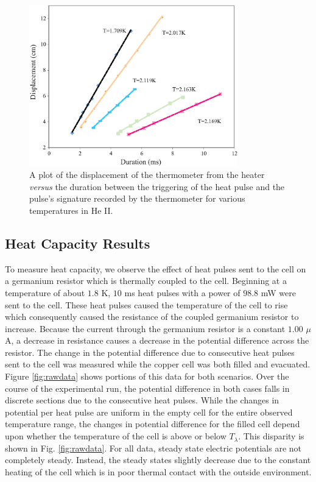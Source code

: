 \begin{figure}[htbp]
\begin{center}
\includegraphics[height=70mm]{./figures/secondsoundraw.eps}
\caption{\small{A plot of the displacement of the thermometer from the heater \emph{versus} the duration between the triggering of the heat pulse and the pulse's signature recorded by the thermometer for various temperatures in He II.}}
\label{fig:secondsoundraw}
\end{center}
\end{figure}


\subsection{Heat Capacity Results}\label{heatcapacityresults}

To measure heat capacity, we observe the effect of heat pulses sent to the cell on a germanium resistor which is thermally coupled to the cell. Beginning at a temperature of about $1.8$ K, $10$ ms heat pulses with a power of $98.8$ mW were sent to the cell.  These heat pulses caused the temperature of the cell to rise which consequently caused the resistance of the coupled germanium resistor to increase.  Because the current through the germanium resistor is a constant $1.00$ $\mu$A, a decrease in resistance causes a decrease in the potential difference across the resistor. The change in the potential difference due to consecutive heat pulses sent to the cell was measured while the copper cell was both filled and evacuated. Figure \ref{fig:rawdata} shows portions of this data for both scenarios.  Over the course of the experimental run, the potential difference in both cases falls in discrete sections due to the consecutive heat pulses. While the changes in potential per heat pulse are uniform in the empty cell for the entire observed temperature range, the changes in potential difference for the filled cell depend upon whether the temperature of the cell is above or below $T_{\lambda}$. This disparity is shown in Fig. \ref{fig:rawdata}. For all data, steady state electric potentials are not completely steady.  Instead, the steady states slightly decrease due to the constant heating of the cell which is in poor thermal contact with the outside environment.

